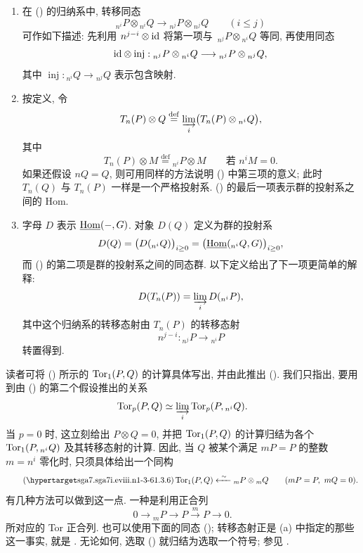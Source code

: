 \begin{enumerate}[label=\alph*)]
\item 在 () 的归纳系中, 转移同态
\[
 {}_{n^i}P\otimes{}_{n^i}Q
 \longrightarrow
 {}_{n^j}P\otimes{}_{n^j}Q
 \qquad(i\leq j)
\]
可作如下描述: 先利用 $n^{j-i}\otimes\mathrm{id}$ 将第一项与 $\,{}_{n^j}P\otimes{}_{n^i}Q$ 等同, 再使用同态
\[
 \mathrm{id}\otimes\operatorname{inj}:
 {}_{n^j}P\otimes{}_{n^i}Q
 \longrightarrow
 {}_{n^j}P\otimes{}_{n^j}Q,
\]
其中 $\operatorname{inj}:{}_{n^i}Q\longrightarrow{}_{n^j}Q$ 表示包含映射.

\item 按定义, 令
\[
 T_n(P)\otimes Q
 \overset{\mathrm{def}}{=}
 \varinjlim_i\bigl(T_n(P)\otimes{}_{n^i}Q\bigr),
\]
其中
\[
 T_n(P)\otimes M
 \overset{\mathrm{def}}{=}
 {}_{n^i}P\otimes M
 \qquad\text{若 }n^iM=0.
\]
如果还假设 $nQ=Q$, 则可用同样的方法说明 () 中第三项的意义; 此时 $T_n(Q)$ 与 $T_n(P)$ 一样是一个严格投射系. () 的最后一项表示群的投射系之间的 Hom.

\item 字母 $D$ 表示 $\uHom(-,G)$. 对象 $D(Q)$ 定义为群的投射系
\[
 D(Q)=\bigl(D({}_{n^i}Q)\bigr)_{i\geq0}
 =\bigl(\uHom({}_{n^i}Q,G)\bigr)_{i\geq0},
\]
而 () 的第二项是群的投射系之间的同态群. 以下定义给出了下一项更简单的解释:
\[
 D(T_n(P))=\varinjlim_iD({}_{n^i}P),
\]
其中这个归纳系的转移态射由 $T_n(P)$ 的转移态射
\[
 n^{j-i}:{}_{n^j}P\longrightarrow{}_{n^i}P
\]
转置得到.
\end{enumerate}

读者可将 () 所示的 $\operatorname{Tor}_1(P,Q)$ 的计算具体写出, 并由此推出 (). 我们只指出, 要用到由 () 的第二个假设推出的关系
\[
 \operatorname{Tor}_p(P,Q)\simeq
 \varinjlim_i\operatorname{Tor}_p(P,{}_{n^i}Q).
\]
当 $p=0$ 时, 这立刻给出 $P\otimes Q=0$, 并把 $\operatorname{Tor}_1(P,Q)$ 的计算归结为各个 $\operatorname{Tor}_1(P,{}_{n^i}Q)$ 及其转移态射的计算. 因此, 当 $Q$ 被某个满足 $mP=P$ 的整数 $m=n^i$ 零化时, 只须具体给出一个同构
\begin{equation}\tag{\SGARefTarget{sga7.sga7i.eviii.n1-3-6}{1.3.6}}
 \Tor_1(P,Q)
 \xleftarrow{\ \sim\ }
 {}_mP\otimes{}_mQ
 \qquad(mP=P,\ mQ=0).
\end{equation}
有几种方法可以做到这一点. 一种是利用正合列
\[
 0\longrightarrow{}_mP\longrightarrow P
 \xrightarrow{\ m\ }P\longrightarrow0.
\]
所对应的 Tor 正合列. 也可以使用下面的同态 (); 转移态射正是 (a) 中指定的那些这一事实, 就是 . 无论如何, 选取 () 就归结为选取一个符号; 参见 .

